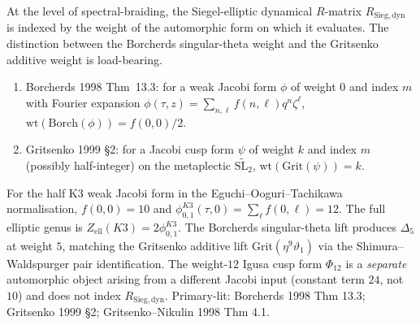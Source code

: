 \begin{remark}
\label{rem:sbf-borch-vs-grit}
At the level of spectral-braiding, the Siegel-elliptic dynamical
$R$-matrix $R_{\mathrm{Sieg,dyn}}$ is indexed by the weight of the
automorphic form on which it evaluates. The distinction between the
Borcherds singular-theta weight and the Gritsenko additive weight is
load-bearing.

\begin{enumerate}[label=\textup{(\roman*)}]
\item Borcherds 1998 Thm~13.3: for a weak Jacobi form $\phi$ of weight
$0$ and index $m$ with Fourier expansion
$\phi(\tau,z) = \sum_{n,\ell} f(n,\ell) q^n \zeta^\ell$,
$\mathrm{wt}(\mathrm{Borch}(\phi)) = f(0,0)/2$.
\item Gritsenko 1999 \S 2: for a Jacobi cusp form $\psi$ of weight $k$
and index $m$ (possibly half-integer) on the metaplectic
$\widetilde{\mathrm{SL}_2}$, $\mathrm{wt}(\mathrm{Grit}(\psi)) = k$.
\end{enumerate}

For the half K3 weak Jacobi form in the Eguchi--Ooguri--Tachikawa
normalisation, $f(0,0) = 10$ and
$\phi_{0,1}^{K3}(\tau, 0) = \sum_\ell f(0,\ell) = 12$. The full elliptic
genus is \(Z_{\mathrm{ell}}(K3)=2\phi_{0,1}^{K3}\). The Borcherds
singular-theta lift produces $\Delta_5$ at weight $5$, matching the
Gritsenko additive lift $\mathrm{Grit}(\eta^9\vartheta_1)$ via the
Shimura--Waldspurger pair identification. The weight-$12$ Igusa cusp
form $\Phi_{12}$ is a \emph{separate} automorphic object arising from
a different Jacobi input (constant term $24$, not $10$) and does not
index $R_{\mathrm{Sieg,dyn}}$. Primary-lit: Borcherds 1998 Thm 13.3;
Gritsenko 1999 \S 2; Gritsenko--Nikulin 1998 Thm 4.1.
\end{remark}

